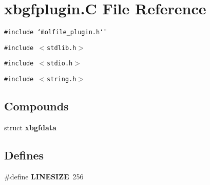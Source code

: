 \section{xbgfplugin.C File Reference}
\label{xbgfplugin_8C}
{\tt \#include \char`\"{}molfile\_\-plugin.h\char`\"{}}\par
{\tt \#include $<$stdlib.h$>$}\par
{\tt \#include $<$stdio.h$>$}\par
{\tt \#include $<$string.h$>$}\par
\subsection*{Compounds}
\begin{CompactItemize}
\item 
struct {\bf xbgfdata}
\end{CompactItemize}
\subsection*{Defines}
\begin{CompactItemize}
\item 
\#define {\bf LINESIZE}\ 256
\end{CompactItemize}
